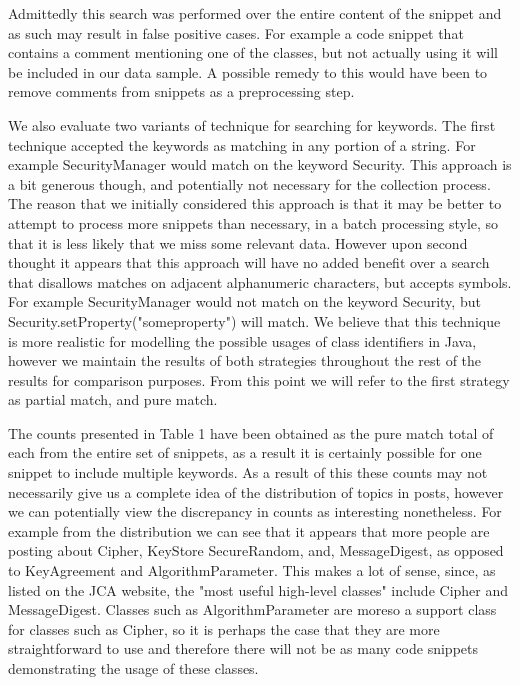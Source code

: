 \documentclass[10pt, conference]{IEEEtran}
\begin{document}
Admittedly this search was performed over the entire content of the snippet and as such may result in false positive cases. For example a code snippet that contains a comment mentioning one of the classes, but not actually using it will be included in our data sample. A possible remedy to this would have been to remove comments from snippets as a preprocessing step. 


We also evaluate two variants of technique for searching for keywords. The first technique accepted the keywords as matching in any portion of a string. For example SecurityManager would match on the keyword Security. This approach is a bit generous though, and potentially not necessary for the collection process. The reason that we initially considered this approach is that it may be better to attempt to process more snippets than necessary, in a batch processing style, so that it is less likely that we miss some relevant data. However upon second thought it appears that this approach will have no added benefit over a search that disallows matches on adjacent alphanumeric characters, but accepts symbols. For example SecurityManager would not match on the keyword Security, but Security.setProperty("someproperty") will match. We believe that this technique is more realistic for modelling the possible usages of class identifiers in Java, however we maintain the results of both strategies throughout the rest of the results for comparison purposes. 
From this point we will refer to the first strategy as partial match, and pure match.

The counts presented in Table 1 have been obtained as the pure match total of each from the entire set of snippets, as a result it is certainly possible for one snippet to include multiple keywords. As a result of this these counts may not necessarily give us a complete idea of the distribution of topics in posts, however we can potentially view the discrepancy in counts as interesting nonetheless. For example from the distribution we can see that it appears that more people are posting about Cipher, KeyStore SecureRandom, and, MessageDigest, as opposed to KeyAgreement and AlgorithmParameter. This makes a lot of sense, since, as listed on the JCA website, the "most useful high-level classes" include Cipher and MessageDigest. Classes such as AlgorithmParameter are moreso a support class for classes such as Cipher, so it is perhaps the case that they are more straightforward to use and therefore there will not be as many code snippets demonstrating the usage of these classes.
 
\end{document}
